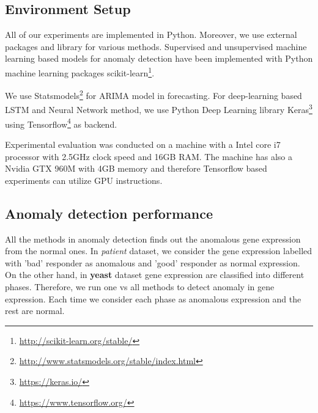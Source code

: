 \subsection{Environment Setup}
All of our experiments are implemented in Python. Moreover, we use external packages and library for various methods.  Supervised and unsupervised machine learning based models for anomaly detection have been implemented with Python machine learning packages scikit-learn\footnote{\url{http://scikit-learn.org/stable/}}.

We use Statsmodels\footnote{\url{http://www.statsmodels.org/stable/index.html}} for ARIMA model in forecasting. For deep-learning based LSTM and Neural Network method, we use Python Deep Learning library Keras\footnote{\url{https://keras.io/}} using Tensorflow\footnote{\url{https://www.tensorflow.org/}} as backend.

Experimental evaluation was conducted on a
machine with a Intel core i7 processor with 2.5GHz clock speed and 16GB RAM. The machine has also a Nvidia GTX 960M with 4GB memory and therefore
Tensorflow based experiments can utilize GPU instructions.


\subsection{Anomaly detection performance}

All the methods in anomaly detection finds out the anomalous gene expression from the normal ones. In \textit{patient} dataset, we consider the gene expression labelled with 'bad' responder as anomalous and  'good' responder as normal expression. On the other hand, in \textbf{yeast} dataset gene expression are classified into different phases. Therefore, we run one vs all methods to detect anomaly in gene expression. Each time we consider each phase as anomalous expression and the rest are normal. 

